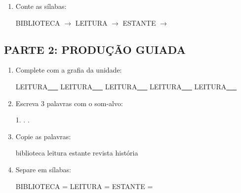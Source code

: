 \begin{exercicio}
\begin{enumerate}
  \item Conte as sílabas:
  \begin{center}
  BIBLIOTECA $\rightarrow$ \underline{\hspace{0.9cm}} \quad LEITURA $\rightarrow$ \underline{\hspace{0.9cm}} \quad ESTANTE $\rightarrow$ \underline{\hspace{0.9cm}}
  \end{center}

\end{enumerate}

\subsection*{PARTE 2: PRODUÇÃO GUIADA}

\begin{enumerate}[resume]

  \item Complete com a grafia da unidade:
  \begin{center}
  LEITURA\underline{~~~} \quad LEITURA\underline{~~~} \quad LEITURA\underline{~~~} \quad LEITURA\underline{~~~} \quad LEITURA\underline{~~~}
  \end{center}

  \item Escreva 3 palavras com o som-alvo:
  \begin{center}
  1. \underline{\hspace{3cm}} . \underline{\hspace{3cm}} . \underline{\hspace{3cm}}
  \end{center}

  \item Copie as palavras:
  \begin{center}
  biblioteca \quad leitura \quad estante \quad revista \quad história
  \end{center}

  \item Separe em sílabas:
  \begin{center}
  BIBLIOTECA = \underline{\hspace{1cm}} \underline{\hspace{1cm}} \quad LEITURA = \underline{\hspace{1cm}} \underline{\hspace{1cm}} \quad ESTANTE = \underline{\hspace{1cm}} \underline{\hspace{1cm}}
  \end{center}


\end{enumerate}
\end{exercicio}

